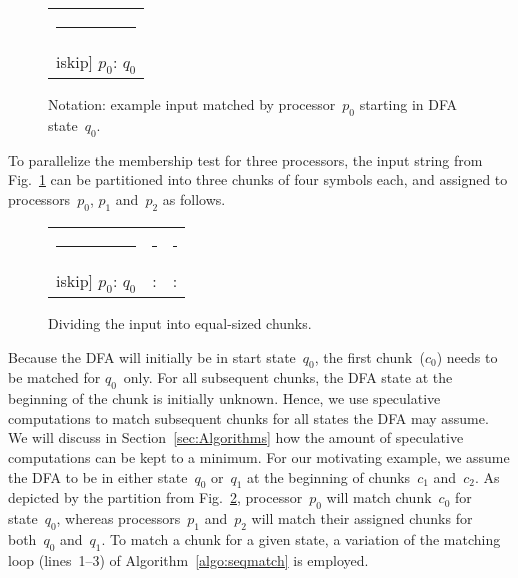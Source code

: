 \documentclass[smallextended]{svjour3}
\newcommand\State[1][{}]{\ensuremath{q_{#1}}}
\newcommand\StartState{\ensuremath{\State[0]}}
\newcommand\Processor[1][{}]{\ensuremath{p_{#1}}}
\newcommand\Chunk[1][{}]{\ensuremath{c_{#1}}}
\begin{document}
\def\iskip{0.8mm}
\def\cskip{1.8mm}
\newlength{\StrH}
\settoheight{\StrH}{}
\def\colwidth{14mm}

\begin{figure}[H]
 \centering \begin{tabular}{l}
    \rule{\colwidth}{0pt}\\iskip]
    \Processor[0]: \StartState
 \end{tabular}
\caption{Notation: example input matched by
processor~\Processor[0]
starting in DFA state~\StartState\label{fig:input_string}.}
\end{figure}

To parallelize the membership test for three processors, the input 
string from Fig.~\ref{fig:input_string}
can be partitioned into three chunks of four symbols each, and assigned
to processors~\Processor[0], \Processor[1] and~\Processor[2] as follows.

\setlength{\intextsep}{2mm}
\begin{figure}[H]
 \centering \begin{tabular}{lll}
    \rule{\colwidth}{0pt}&\rule{\colwidth}{0pt}&\rule{\colwidth}{0pt}\\iskip]
    \Processor[0]: \StartState&
    : &
    : 
 \end{tabular}
 \caption{Dividing the input into equal-sized chunks.\label{fig:naive}}
\end{figure}
Because the DFA will initially
be in
start state~\StartState,
the first chunk~(\Chunk[0]) needs to be matched
for \StartState\ only. 
For all subsequent chunks, the DFA state at the beginning of the chunk is initially unknown.
Hence, we use speculative computations to match subsequent chunks for all states the DFA may assume.
We will discuss in Section~\ref{sec:Algorithms} how the amount of speculative computations
can be kept to a minimum.
For our motivating example, we assume the DFA to be in either
state~\State[0] or~\State[1] at the beginning of chunks~\Chunk[1]
and~\Chunk[2]. As depicted by the partition from Fig.~\ref{fig:naive},
processor~\Processor[0] will match chunk~\Chunk[0] for state~\StartState,
whereas processors~\Processor[1] and~\Processor[2] will match their assigned
chunks for both~\State[0] and~\State[1].
To match a chunk for a given state, a variation of the matching loop (lines~1--3)
of Algorithm~\ref{algo:seqmatch} is employed.
\end{document}
